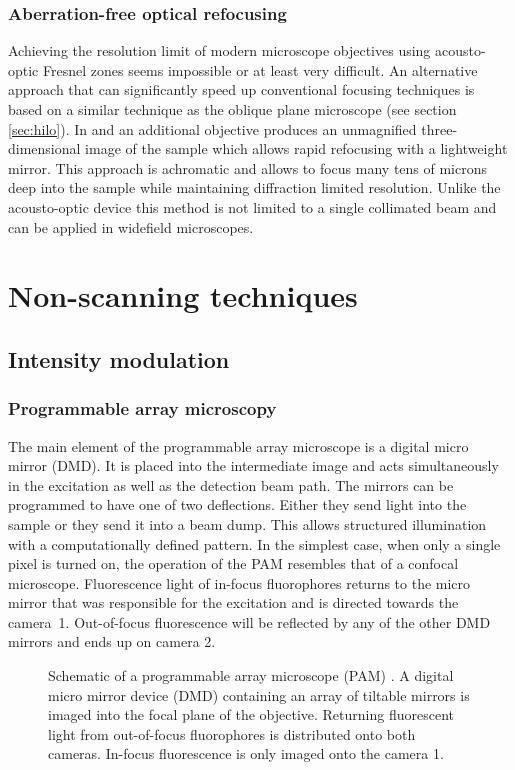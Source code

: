 \subsubsection{Aberration-free optical refocusing}
Achieving the resolution limit of modern microscope objectives using
acousto-optic Fresnel zones seems impossible or at least very
difficult. An alternative approach that can significantly speed up
conventional focusing techniques is based on a similar technique as
the oblique plane microscope (see section \ref{sec:hilo}). In
\cite{Botcherby2007} and \cite{botcherby2012aberration} an additional
objective produces an unmagnified three-dimensional image of the
sample which allows rapid refocusing with a lightweight mirror. This
approach is achromatic and allows to focus many tens of microns deep
into the sample while maintaining diffraction limited
resolution. Unlike the acousto-optic device this method is not limited
to a single collimated beam and can be applied in widefield
microscopes.

\section{Non-scanning techniques}
\subsection{Intensity modulation}
\subsubsection{Programmable array microscopy}
\label{sec:pam}
The main element of the programmable array microscope is a digital
micro mirror (DMD). It is placed into the intermediate image and acts
simultaneously in the excitation as well as the detection beam
path. The mirrors can be programmed to have one of two
deflections. Either they send light into the sample or they send it
into a beam dump. This allows structured illumination with a
computationally defined pattern. In the simplest case, when only a
single pixel is turned on, the operation of the PAM resembles that of
a confocal microscope. Fluorescence light of in-focus fluorophores
returns to the micro mirror that was responsible for the excitation and
is directed towards the camera~1. Out-of-focus fluorescence will be
reflected by any of the other DMD mirrors and ends up on camera 2.

\begin{figure}[htbp]
  \centering
  \caption{Schematic of a programmable array microscope (PAM)
    \citep[inspired by][]{Verveer1998}. A digital micro mirror
    device (DMD) containing an array of tiltable mirrors is imaged
    into the focal plane of the objective. Returning fluorescent light
    from out-of-focus fluorophores is distributed onto both
    cameras. In-focus fluorescence is only imaged onto the camera 1.}
  \label{fig:pam-sketch}
\end{figure}


